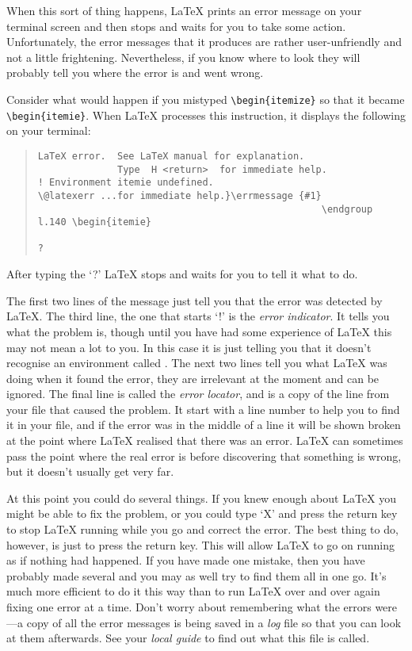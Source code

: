 When this sort of thing happens, \LaTeX{} prints an error message on your
terminal screen and then stops and waits for you to take some action.
Unfortunately, the error messages that it produces are rather user-unfriendly
and not a little frightening.  Nevertheless, if you know where to look they
will probably tell you where the error is and went wrong.

Consider what would happen if you mistyped \verb|\begin{itemize}| so that it
became \verb|\begin{itemie}|.  When \LaTeX{} processes this instruction, it
displays the following on your terminal:
\begin{quote}\footnotesize\begin{verbatim}
LaTeX error.  See LaTeX manual for explanation.
              Type  H <return>  for immediate help.
! Environment itemie undefined.
\@latexerr ...for immediate help.}\errmessage {#1}
                                                  \endgroup
l.140 \begin{itemie}

?
\end{verbatim}\end{quote}
After typing the `?' \LaTeX{} stops and waits for you to tell it what to do.

The first two lines of the message just tell you that the error was detected by
\LaTeX{}. The third line, the one that starts `!' is the {\em error indicator}.
 It
tells you what the problem is, though until you have had some experience of
\LaTeX{} this may not mean a lot to you.  In this case it is just telling you
that it doesn't recognise an environment called .
The next two lines tell you what
\LaTeX{} was doing when it found the error, they are irrelevant at the moment
and can be ignored. The final line is called the {\em error locator}, and is
a copy of the line from your file that caused the problem.
It start with a line number to help you to find it in your file, and
if the error was in the middle of a line it will be shown
broken at the point where \LaTeX{} realised that there was an error.  \LaTeX{}
can sometimes pass the point where the real error is before discovering that
something is wrong, but it doesn't usually get very far.

At this point you could do several things.  If you knew enough about \LaTeX{}
you might be able to fix the problem, or you could type `X' and press the
return key to stop \LaTeX{} running while you go and correct the error.  The
best thing to do, however, is just to press the return key.  This will allow
\LaTeX{} to go on running as if nothing had happened.  If you have made one
mistake, then you have probably made several and you may as well try to find
them all in one go.  It's much more efficient to do it this way than to run
\LaTeX{} over and over again fixing one error at a time. Don't worry about
remembering what the errors were---a copy of all the error messages is being
saved in a {\em log\/} file so that you can look at them afterwards.  See your
{\em local guide\/} to find out what this file is called.

